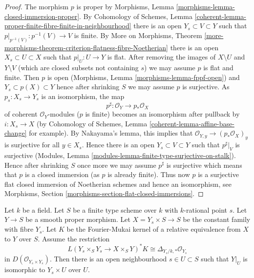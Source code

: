 \begin{proof}
The morphism $p$ is proper by Morphisms, Lemma
\ref{morphisms-lemma-closed-immersion-proper}.
By Cohomology of Schemes, Lemma
\ref{coherent-lemma-proper-finite-fibre-finite-in-neighbourhood}
there is an open $Y_s \subset V \subset Y$ such that
$p|_{p^{-1}(V)} : p^{-1}(V) \to V$ is finite.
By More on Morphisms, Theorem
\ref{more-morphisms-theorem-criterion-flatness-fibre-Noetherian}
there is an open $X_s \subset U \subset X$ such that
$p|_U : U \to Y$ is flat. After removing the images of
$X \setminus U$ and $Y \setminus V$ (which are closed subsets
not containing $s$) we may assume $p$ is flat and finite.
Then $p$ is open (Morphisms, Lemma \ref{morphisms-lemma-fppf-open})
and $Y_s \subset p(X) \subset Y$ hence after shrinking $S$
we may assume $p$ is surjective.
As $p_s : X_s \to Y_s$ is an isomorphism, the map
$$
p^\sharp : \mathcal{O}_Y \longrightarrow p_*\mathcal{O}_X
$$
of coherent $\mathcal{O}_Y$-modules ($p$ is finite)
becomes an isomorphism after pullback by $i : X_s \to X$
(by Cohomology of Schemes, Lemma
\ref{coherent-lemma-affine-base-change} for example).
By Nakayama's lemma, this implies that
$\mathcal{O}_{Y, y} \to (p_*\mathcal{O}_X)_y$ is surjective
for all $y \in X_s$. Hence there is an open $Y_s \subset V \subset Y$
such that $p^\sharp|_V$ is surjective
(Modules, Lemma \ref{modules-lemma-finite-type-surjective-on-stalk}).
Hence after shrinking $S$ once more we may assume
$p^\sharp$ is surjective which means that $p$ is a closed
immersion (as $p$ is already finite).
Thus now $p$ is a surjective flat closed immersion
of Noetherian schemes and hence an isomorphism, see
Morphisms, Section \ref{morphisms-section-flat-closed-immersions}.
\end{proof}

\begin{lemma}
\label{lemma-no-deformations}
Let $k$ be a field. Let $S$ be a finite type scheme over $k$
with $k$-rational point $s$. Let $Y \to S$ be a smooth proper morphism.
Let $X = Y_s \times S \to S$ be the constant family with fibre
$Y_s$. Let $K$ be the Fourier-Mukai kernel of a relative equivalence
from $X$ to $Y$ over $S$. Assume the restriction
$$
L(Y_s \times_S Y_s \to X \times_S Y)^*K \cong 
\Delta_{Y_s/k, *} \mathcal{O}_{Y_s}
$$
in $D(\mathcal{O}_{Y_s \times Y_s})$. Then there is an open neighbourhood
$s \in U \subset S$ such that $Y|_U$ is isomorphic to $Y_s \times U$ over $U$.
\end{lemma}

